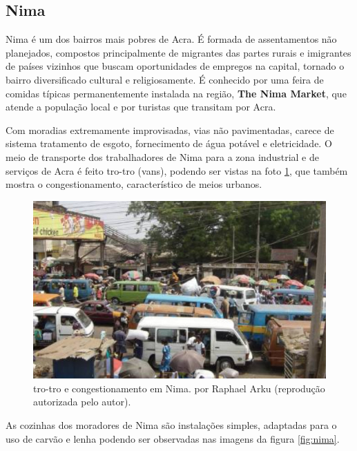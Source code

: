 \subsection{Nima}

Nima é um dos bairros mais pobres de Acra. É formada de assentamentos não 
planejados, compostos principalmente de migrantes das partes rurais e 
imigrantes de países vizinhos que buscam oportunidades de empregos na capital, 
tornado o bairro diversificado cultural e religiosamente. É conhecido por uma 
feira de comidas típicas permanentemente instalada na região,
\textbf{The Nima Market}, que atende a população local e por turistas que 
transitam por Acra.

Com moradias extremamente improvisadas, vias não pavimentadas, carece de 
sistema tratamento de esgoto, fornecimento de água potável e eletricidade. 
O meio de transporte dos trabalhadores de Nima para a zona industrial e de 
serviços de Acra é feito tro-tro (vans), podendo ser vistas na foto 
\ref{fig:nima_tro}, que também mostra o congestionamento, característico de 
meios urbanos.  

\begin{figure}[H]
  \centering
    \includegraphics[width=0.5\linewidth]{../inputs/images/zheng/arku4.jpeg}
    \caption{tro-tro e congestionamento em Nima. por Raphael Arku 
           (reprodução autorizada pelo autor). \label{fig:nima_tro}}
\end{figure}

As cozinhas dos moradores de Nima são instalações simples, adaptadas para o uso
de carvão e lenha podendo ser observadas nas imagens da figura \ref{fig:nima}.


